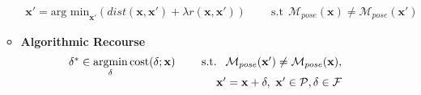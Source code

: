\begin{enumerate}
\begin{itemize}
        \begin{equation}
        \begin{array}{r}
        \mathbf{x}' = \text{arg min}_{\mathbf{x}'} \left( \mathit{dist}(\mathbf{x}, \mathbf{x}') + \lambda \mathit{r}(\mathbf{x}, \mathbf{x}') \right)\  \quad\quad  \text{s.t} 
         \ \ \mathcal{M}_{pose}(\mathbf{x}) \neq \mathcal{M}_{pose}(\mathbf{x}')
        \end{array}    
        \label{eq:recourse}
        \end{equation}
    \item \textbf{Algorithmic Recourse} \newline
        \begin{equation}
        \begin{array}{r}
        \delta^{*} \in \underset{\delta}{\operatorname{argmin}} \operatorname{cost}(\delta ; \mathbf{x}) \quad\quad $\text { s.t. } $\mathcal{M}_{pose}(\mathbf{x}') \neq \mathcal{M}_{pose}( \mathbf{x}), \\
        \mathbf{x}'=\mathbf{x} +\delta, \
        \mathbf{x}' \in \mathcal{P}, \delta \in \mathcal{F}
        \vspace{-6pt}
        \end{array}
        \label{eq:recourse}
        \end{equation}
     

\end{itemize}
\end{enumerate}

